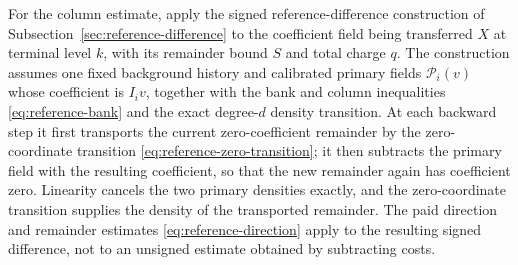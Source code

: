 For the column estimate, apply the signed reference-difference construction
of Subsection~\ref{sec:reference-difference} to the coefficient field being transferred
\(X\) at terminal level \(k\), with its remainder bound \(S\) and total
charge \(q\). The construction assumes one fixed background history and
calibrated primary fields \(\mathcal P_i(v)\) whose coefficient is
\(I_i v\), together with the bank and column inequalities
\eqref{eq:reference-bank} and the exact degree-\(d\) density transition.
At each backward step it first transports the current zero-coefficient
remainder by the zero-coordinate transition
\eqref{eq:reference-zero-transition}; it then subtracts the primary field
with the resulting coefficient, so that the new remainder again has
coefficient zero. Linearity cancels the two primary densities exactly, and
the zero-coordinate transition supplies the density of the transported
remainder. The paid direction and remainder estimates
\eqref{eq:reference-direction} apply to the resulting signed difference,
not to an unsigned estimate obtained by subtracting costs.

